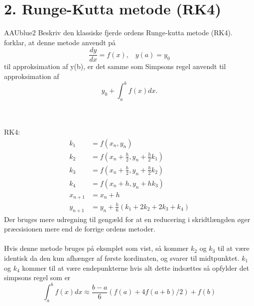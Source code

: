 \section*{2. Runge-Kutta metode (RK4)}
% 
%
\begin{color}{AAUblue2}
%
Beskriv den klassiske fjerde ordens Runge-kutta metode (RK4). forklar, at denne metode anvendt på
$$\frac{dy}{dx}=f(x), \phantom{...}y(a)=y_0$$
til approksimation af y(b), er det samme som Simpsons regel anvendt til approksimation af 
$$y_0+\int^b_a f(x)dx. $$
% 
\end{color}
\\\\
RK4:\\
\begin{align*}
k_1&=f(x_n,y_n)\\
k_2&=f(x_n+\frac{h}{2},y_n+\frac{h}{2}k_1)\\
k_3&=f(x_n+\frac{h}{2},y_n+\frac{h}{2}k_2)\\
k_4&=f(x_n+h,y_n+h k_3)\\
x_{n+1}&=x_n+h\\
y_{n+1}&=y_n+\frac{h}{6}(k_1+2k_2+2k_3+k_4)
\end{align*}
Der bruges mere udregning til gengæld for at en reducering i skridtlængden øger præcsisionen mere end de forrige ordens metoder.\\\\
% 
%
Hvis denne metode bruges på eksmplet som vist, så kommer $k_2$ og $k_3$ til at være identisk da den kun afhænger af første kordinaten, og svarer til midtpunktet. $k_1$ og $k_4$ kommer til at være endepunkterne hvis alt dette indsættes så opfylder det simpsons regel som er 
$$\int_a^bf(x)dx \approx \frac{b-a}{6}(f(a)+4f(a+b)/2)+f(b)$$

